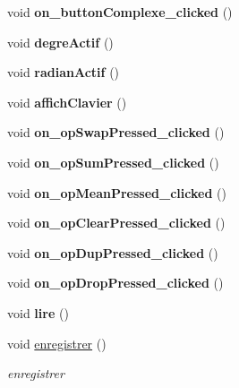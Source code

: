 \begin{DoxyCompactItemize}
\item 
\hypertarget{class_main_window_a5582fac4338308428100cf72bf080825}{void {\bfseries on\-\_\-button\-Complexe\-\_\-clicked} ()}\label{class_main_window_a5582fac4338308428100cf72bf080825}

\item 
\hypertarget{class_main_window_a4a6c10aee551d5c21987b802a8e035af}{void {\bfseries degre\-Actif} ()}\label{class_main_window_a4a6c10aee551d5c21987b802a8e035af}

\item 
\hypertarget{class_main_window_ae1903a911f3dacc79dcc73a7ea55e559}{void {\bfseries radian\-Actif} ()}\label{class_main_window_ae1903a911f3dacc79dcc73a7ea55e559}

\item 
\hypertarget{class_main_window_afed67fd3b88ad8924b8b5cde92c6b8ef}{void {\bfseries affich\-Clavier} ()}\label{class_main_window_afed67fd3b88ad8924b8b5cde92c6b8ef}

\item 
\hypertarget{class_main_window_a17d86cbac874d7799480d1fab5d5b665}{void {\bfseries on\-\_\-op\-Swap\-Pressed\-\_\-clicked} ()}\label{class_main_window_a17d86cbac874d7799480d1fab5d5b665}

\item 
\hypertarget{class_main_window_a5b302c7e69ac013830a2a6f8524e9e65}{void {\bfseries on\-\_\-op\-Sum\-Pressed\-\_\-clicked} ()}\label{class_main_window_a5b302c7e69ac013830a2a6f8524e9e65}

\item 
\hypertarget{class_main_window_a0fc0ce6b7433835bb4ff16327fad0ecf}{void {\bfseries on\-\_\-op\-Mean\-Pressed\-\_\-clicked} ()}\label{class_main_window_a0fc0ce6b7433835bb4ff16327fad0ecf}

\item 
\hypertarget{class_main_window_a4cc2ab47a2eb61fbda8c0135165659ab}{void {\bfseries on\-\_\-op\-Clear\-Pressed\-\_\-clicked} ()}\label{class_main_window_a4cc2ab47a2eb61fbda8c0135165659ab}

\item 
\hypertarget{class_main_window_af3c07e1e6b645cca78e2c6372b948a7b}{void {\bfseries on\-\_\-op\-Dup\-Pressed\-\_\-clicked} ()}\label{class_main_window_af3c07e1e6b645cca78e2c6372b948a7b}

\item 
\hypertarget{class_main_window_a007ed31ec5bb9f9709d1df9b821ec8d0}{void {\bfseries on\-\_\-op\-Drop\-Pressed\-\_\-clicked} ()}\label{class_main_window_a007ed31ec5bb9f9709d1df9b821ec8d0}

\item 
\hypertarget{class_main_window_a35632c11ed307eaadd327bbe560d299b}{void {\bfseries lire} ()}\label{class_main_window_a35632c11ed307eaadd327bbe560d299b}

\item 
void \hyperlink{class_main_window_a7ecd3b141f855acca0f75ac4b403f8fc}{enregistrer} ()
\begin{DoxyCompactList}\small\item\em enregistrer \end{DoxyCompactList}\end{DoxyCompactItemize}
